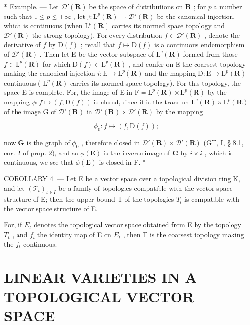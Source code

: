 * Example. --- Let \(\mathcal{D}'(\mathbf{R})\) be the space of distributions on \(\mathbf{R}\) ; for \(p\) a number such that \(1 \leqslant p \leqslant +\infty\) , let \(j: \mathrm{L}^p(\mathbf{R}) \to \mathcal{D}'(\mathbf{R})\) be the canonical injection, which is continuous (when \(\mathrm{L}^p(\mathbf{R})\) carries its normed space topology and \(\mathcal{D}'(\mathbf{R})\) the strong topology). For every distribution \(f \in \mathcal{D}'(\mathbf{R})\) , denote the derivative of \(f\) by \(\mathrm{D}(f)\) ; recall that \(f \mapsto \mathrm{D}(f)\) is a continuous endomorphism of \(\mathcal{D}'(\mathbf{R})\) . Then let E be the vector subspace of \(\mathrm{L}^p(\mathbf{R})\) formed from those \(f \in \mathrm{L}^p(\mathbf{R})\) for which \(\mathrm{D}(f) \in \mathrm{L}^p(\mathbf{R})\) , and confer on E the coarsest topology making the canonical injection \(i: \mathrm{E} \to \mathrm{L}^p(\mathbf{R})\) and the mapping \(\mathrm{D}: \mathrm{E} \to \mathrm{L}^p(\mathbf{R})\) continuous ( \(\mathrm{L}^p(\mathbf{R})\) carries its normed space topology). For this topology, the space E is complete. For, the image of E in \(\mathrm{F} = \mathrm{L}^p(\mathbf{R}) \times \mathrm{L}^p(\mathbf{R})\) by the mapping \(\phi: f \mapsto (f, \mathrm{D}(f))\) is closed, since it is the trace on \(\mathrm{L}^p(\mathbf{R}) \times \mathrm{L}^p(\mathbf{R})\) of the image G of \(\mathcal{D}'(\mathbf{R})\) in \(\mathcal{D}'(\mathbf{R}) \times \mathcal{D}'(\mathbf{R})\) by the mapping

\[
\phi_ {0}: f \mapsto (f, \mathrm{D} (f));
\]

now \(\mathbf{G}\) is the graph of \(\phi_0\) , therefore closed in \(\mathcal{D}'(\mathbf{R}) \times \mathcal{D}'(\mathbf{R})\) (GT, I, § 8.1, cor. 2 of prop. 2), and as \(\phi(\mathbf{E})\) is the inverse image of \(\mathbf{G}\) by \(i \times i\) , which is continuous, we see that \(\phi(\mathbf{E})\) is closed in F. *

COROLLARY 4. --- Let E be a vector space over a topological division ring K, and let \((\mathcal{T}_{\iota})_{\iota\in I}\) be a family of topologies compatible with the vector space structure of E; then the upper bound T of the topologies \(T_{\iota}\) is compatible with the vector space structure of E.

For, if \(E_{t}\) denotes the topological vector space obtained from E by the topology \(T_{t}\) , and \(f_{t}\) the identity map of E on \(E_{t}\) , then T is the coarsest topology making the \(f_{t}\) continuous.

\section{LINEAR VARIETIES IN A TOPOLOGICAL VECTOR SPACE}

